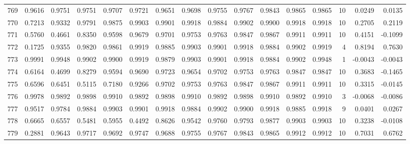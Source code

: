 \begin{tabular}{lrrrrrrrrrrrrrrr}
769 &      0.9616 &  0.9751 &  0.9751 &  0.9707 &  0.9721 &  0.9651 &  0.9698 &  0.9755 &  0.9767 &  0.9843 &   0.9865 &     0.9865 &     10 &                    0.0249 &                     0.0135 \\
770 &      0.7213 &  0.9332 &  0.9791 &  0.9875 &  0.9903 &  0.9901 &  0.9918 &  0.9884 &  0.9902 &  0.9900 &   0.9918 &     0.9918 &     10 &                    0.2705 &                     0.2119 \\
771 &      0.5760 &  0.4661 &  0.8350 &  0.9598 &  0.9679 &  0.9701 &  0.9753 &  0.9763 &  0.9847 &  0.9867 &   0.9911 &     0.9911 &     10 &                    0.4151 &                    -0.1099 \\
772 &      0.1725 &  0.9355 &  0.9820 &  0.9861 &  0.9919 &  0.9885 &  0.9903 &  0.9901 &  0.9918 &  0.9884 &   0.9902 &     0.9919 &      4 &                    0.8194 &                     0.7630 \\
773 &      0.9991 &  0.9948 &  0.9902 &  0.9900 &  0.9919 &  0.9879 &  0.9903 &  0.9901 &  0.9918 &  0.9884 &   0.9902 &     0.9948 &      1 &                   -0.0043 &                    -0.0043 \\
774 &      0.6164 &  0.4699 &  0.8279 &  0.9594 &  0.9690 &  0.9723 &  0.9654 &  0.9702 &  0.9753 &  0.9763 &   0.9847 &     0.9847 &     10 &                    0.3683 &                    -0.1465 \\
775 &      0.6596 &  0.6451 &  0.5115 &  0.7180 &  0.9266 &  0.9702 &  0.9753 &  0.9763 &  0.9847 &  0.9867 &   0.9911 &     0.9911 &     10 &                    0.3315 &                    -0.0145 \\
776 &      0.9978 &  0.9892 &  0.9898 &  0.9910 &  0.9892 &  0.9898 &  0.9910 &  0.9892 &  0.9898 &  0.9910 &   0.9892 &     0.9910 &      3 &                   -0.0068 &                    -0.0086 \\
777 &      0.9517 &  0.9784 &  0.9884 &  0.9903 &  0.9901 &  0.9918 &  0.9884 &  0.9902 &  0.9900 &  0.9918 &   0.9885 &     0.9918 &      9 &                    0.0401 &                     0.0267 \\
778 &      0.6665 &  0.6557 &  0.5481 &  0.5955 &  0.4492 &  0.8626 &  0.9542 &  0.9760 &  0.9793 &  0.9877 &   0.9903 &     0.9903 &     10 &                    0.3238 &                    -0.0108 \\
779 &      0.2881 &  0.9643 &  0.9717 &  0.9692 &  0.9747 &  0.9688 &  0.9755 &  0.9767 &  0.9843 &  0.9865 &   0.9912 &     0.9912 &     10 &                    0.7031 &                     0.6762 \\

\end{tabular}
